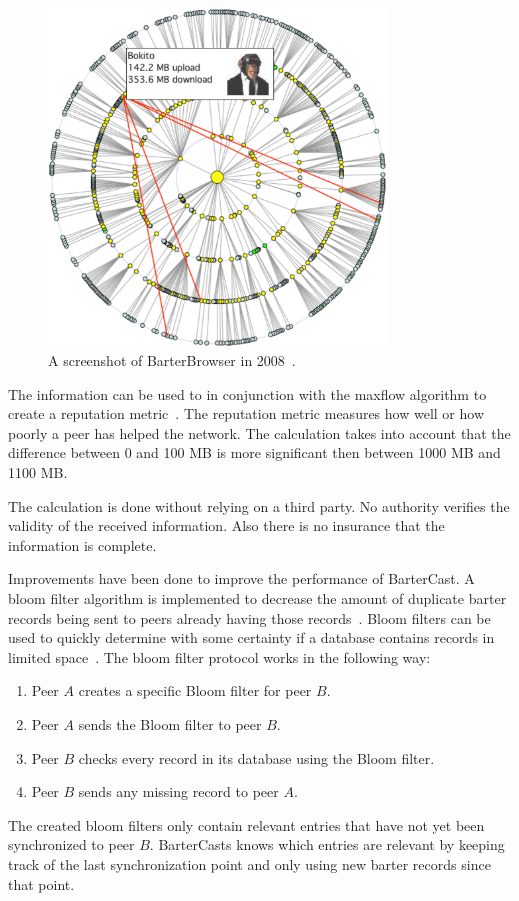\begin{figure}
	\centerline{\includegraphics[width=0.8\textwidth]{relatedWork/figs/barterBrowser.eps}}
	\caption{A screenshot of BarterBrowser in 2008~\cite{pouwelse-buddycast}.}
	\label{fig:barterbrowser}
\end{figure}

The information can be used to in conjunction with the maxflow algorithm
to create a reputation metric~\cite{meulpolder-bartercast-paper}.
The reputation metric measures how well or how poorly a peer has helped the network.
The calculation takes into account that the difference between 0 and 100 MB is more significant
then between 1000 MB and 1100 MB.

The calculation is done without relying on a third party.
No authority verifies the validity of the received information.
Also there is no insurance that the information is complete.

Improvements have been done to improve the performance of BarterCast.
A bloom filter algorithm is implemented to decrease the amount of duplicate barter records
being sent to peers already having those records~\cite{logiotatidis-splash}.
Bloom filters can be used to quickly determine with some certainty
if a database contains records in limited space~\cite{broder-bloomfilter}.
The bloom filter protocol works in the following way:
\begin{enumerate}
    \item Peer $A$ creates a specific Bloom filter for peer $B$.
    \item Peer $A$ sends the Bloom filter to peer $B$.
    \item Peer $B$ checks every record in its database using the Bloom filter.
    \item Peer $B$ sends any missing record to peer $A$.
\end{enumerate}
The created bloom filters only contain relevant entries that have not yet been synchronized to peer $B$.
BarterCasts knows which entries are relevant by keeping track of the last synchronization point
and only using new barter records since that point.

